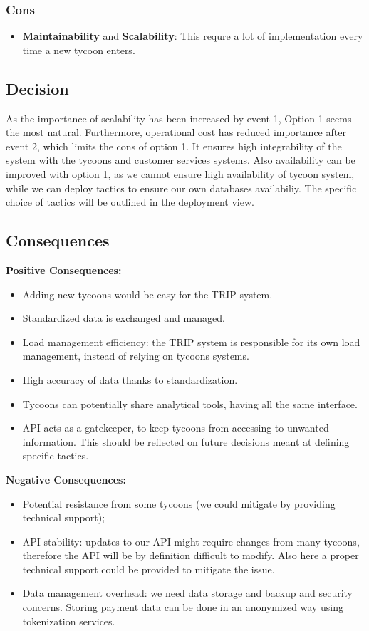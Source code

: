 \subsubsection*{Cons}
\begin{itemize}[noitemsep]
    \item \textbf{Maintainability} and \textbf{Scalability}: This requre a lot of implementation every time a new tycoon enters.
\end{itemize}

\subsection*{Decision}
As the importance of scalability has been increased by event 1, Option 1 seems the most natural.
Furthermore, operational cost has reduced importance after event 2, which limits the cons of option 1.
It ensures high integrability of the system with the tycoons and customer services systems.
Also availability can be improved with option 1, as we cannot ensure high availability of tycoon system, while we can deploy tactics to ensure our own databases availabiliy. The specific choice of tactics will be outlined in the deployment view.

\subsection*{Consequences}
\textbf{Positive Consequences:}
\begin{itemize}
    \item Adding new tycoons would be easy for the TRIP system.
    \item Standardized data is exchanged and managed.
    \item Load management efficiency: the TRIP system is responsible for its own load management, instead of relying on tycoons systems.
    \item High accuracy of data thanks to standardization.
    \item Tycoons can potentially share analytical tools, having all the same interface.
    \item API acts as a gatekeeper, to keep tycoons from accessing to unwanted information. This should be reflected on future decisions meant at defining specific tactics.
\end{itemize}
\textbf{Negative Consequences:}
\begin{itemize}
    \item Potential resistance from some tycoons (we could mitigate by providing technical support);
    \item API stability: updates to our API might require changes from many tycoons, therefore the API will be by definition difficult to modify. Also here a proper technical support could be provided to mitigate the issue.
    \item Data management overhead: we need data storage and backup and security concerns. Storing payment data can be done in an anonymized way using tokenization services.
\end{itemize}
